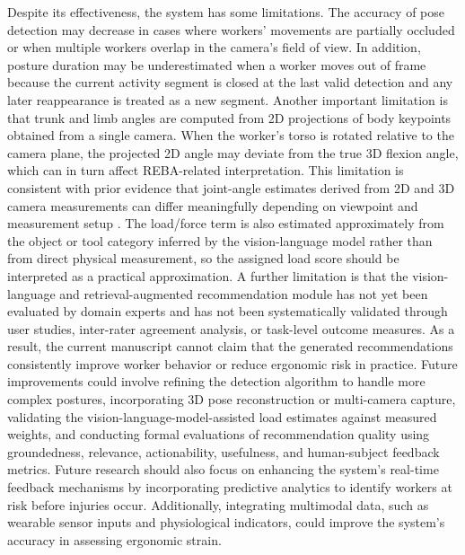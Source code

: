 \documentclass[11pt]{article}
\begin{document}

Despite its effectiveness, the system has some limitations. The accuracy of pose detection may decrease in cases where workers' movements are partially occluded or when multiple workers overlap in the camera's field of view. In addition, posture duration may be underestimated when a worker moves out of frame because the current activity segment is closed at the last valid detection and any later reappearance is treated as a new segment. Another important limitation is that trunk and limb angles are computed from 2D projections of body keypoints obtained from a single camera. When the worker's torso is rotated relative to the camera plane, the projected 2D angle may deviate from the true 3D flexion angle, which can in turn affect REBA-related interpretation. This limitation is consistent with prior evidence that joint-angle estimates derived from 2D and 3D camera measurements can differ meaningfully depending on viewpoint and measurement setup \citep{vancrombrugge2022accuracy}. The load/force term is also estimated approximately from the object or tool category inferred by the vision-language model rather than from direct physical measurement, so the assigned load score should be interpreted as a practical approximation. A further limitation is that the vision-language and retrieval-augmented recommendation module has not yet been evaluated by domain experts and has not been systematically validated through user studies, inter-rater agreement analysis, or task-level outcome measures. As a result, the current manuscript cannot claim that the generated recommendations consistently improve worker behavior or reduce ergonomic risk in practice. Future improvements could involve refining the detection algorithm to handle more complex postures, incorporating 3D pose reconstruction or multi-camera capture, validating the vision-language-model-assisted load estimates against measured weights, and conducting formal evaluations of recommendation quality using groundedness, relevance, actionability, usefulness, and human-subject feedback metrics. Future research should also focus on enhancing the system's real-time feedback mechanisms by incorporating predictive analytics to identify workers at risk before injuries occur. Additionally, integrating multimodal data, such as wearable sensor inputs and physiological indicators, could improve the system's accuracy in assessing ergonomic strain.
\end{document}
